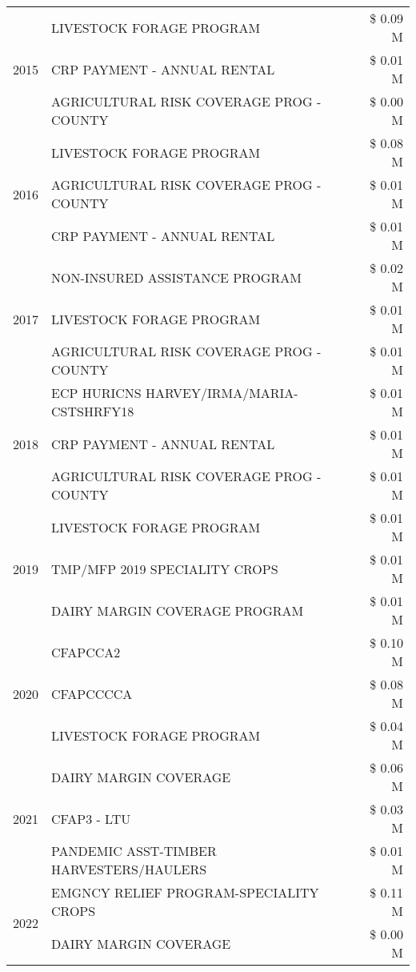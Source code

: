 \begin{tabular}{llr}
\cline{1-3}
\multirow[t]{3}{*}{2015} & LIVESTOCK FORAGE PROGRAM & \$ 0.09 M \\
 & CRP PAYMENT - ANNUAL RENTAL & \$ 0.01 M \\
 & AGRICULTURAL RISK COVERAGE PROG - COUNTY & \$ 0.00 M \\
\cline{1-3}
\multirow[t]{3}{*}{2016} & LIVESTOCK FORAGE PROGRAM & \$ 0.08 M \\
 & AGRICULTURAL RISK COVERAGE PROG - COUNTY & \$ 0.01 M \\
 & CRP PAYMENT - ANNUAL RENTAL & \$ 0.01 M \\
\cline{1-3}
\multirow[t]{3}{*}{2017} & NON-INSURED ASSISTANCE PROGRAM & \$ 0.02 M \\
 & LIVESTOCK FORAGE PROGRAM & \$ 0.01 M \\
 & AGRICULTURAL RISK COVERAGE PROG - COUNTY & \$ 0.01 M \\
\cline{1-3}
\multirow[t]{3}{*}{2018} & ECP HURICNS HARVEY/IRMA/MARIA-CSTSHRFY18 & \$ 0.01 M \\
 & CRP PAYMENT - ANNUAL RENTAL & \$ 0.01 M \\
 & AGRICULTURAL RISK COVERAGE PROG - COUNTY & \$ 0.01 M \\
\cline{1-3}
\multirow[t]{3}{*}{2019} & LIVESTOCK FORAGE PROGRAM & \$ 0.01 M \\
 & TMP/MFP 2019 SPECIALITY CROPS & \$ 0.01 M \\
 & DAIRY MARGIN COVERAGE PROGRAM & \$ 0.01 M \\
\cline{1-3}
\multirow[t]{3}{*}{2020} & CFAPCCA2 & \$ 0.10 M \\
 & CFAPCCCCA & \$ 0.08 M \\
 & LIVESTOCK FORAGE PROGRAM & \$ 0.04 M \\
\cline{1-3}
\multirow[t]{3}{*}{2021} & DAIRY MARGIN COVERAGE & \$ 0.06 M \\
 & CFAP3 - LTU & \$ 0.03 M \\
 & PANDEMIC ASST-TIMBER HARVESTERS/HAULERS & \$ 0.01 M \\
\cline{1-3}
\multirow[t]{2}{*}{2022} & EMGNCY RELIEF PROGRAM-SPECIALITY CROPS & \$ 0.11 M \\
 & DAIRY MARGIN COVERAGE & \$ 0.00 M \\
\cline{1-3}
\bottomrule
\end{tabular}
